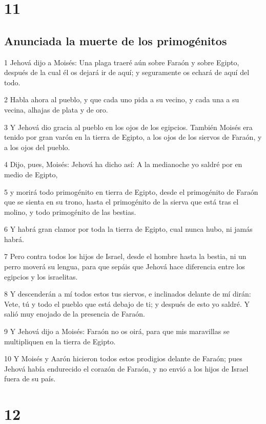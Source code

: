 \chapter{11}

\section*{Anunciada la muerte de los primogénitos}

\par 1 Jehová dijo a Moisés: Una plaga traeré aún sobre Faraón y sobre Egipto, después de la cual él os dejará ir de aquí; y seguramente os echará de aquí del todo.
\par 2 Habla ahora al pueblo, y que cada uno pida a su vecino, y cada una a su vecina, alhajas de plata y de oro.
\par 3 Y Jehová dio gracia al pueblo en los ojos de los egipcios. También Moisés era tenido por gran varón en la tierra de Egipto, a los ojos de los siervos de Faraón, y a los ojos del pueblo.
\par 4 Dijo, pues, Moisés: Jehová ha dicho así: A la medianoche yo saldré por en medio de Egipto,
\par 5 y morirá todo primogénito en tierra de Egipto, desde el primogénito de Faraón que se sienta en su trono, hasta el primogénito de la sierva que está tras el molino, y todo primogénito de las bestias.
\par 6 Y habrá gran clamor por toda la tierra de Egipto, cual nunca hubo, ni jamás habrá.
\par 7 Pero contra todos los hijos de Israel, desde el hombre hasta la bestia, ni un perro moverá su lengua, para que sepáis que Jehová hace diferencia entre los egipcios y los israelitas.
\par 8 Y descenderán a mí todos estos tus siervos, e inclinados delante de mí dirán: Vete, tú y todo el pueblo que está debajo de ti; y después de esto yo saldré. Y salió muy enojado de la presencia de Faraón.
\par 9 Y Jehová dijo a Moisés: Faraón no os oirá, para que mis maravillas se multipliquen en la tierra de Egipto.
\par 10 Y Moisés y Aarón hicieron todos estos prodigios delante de Faraón; pues Jehová había endurecido el corazón de Faraón, y no envió a los hijos de Israel fuera de su país.

\chapter{12}

